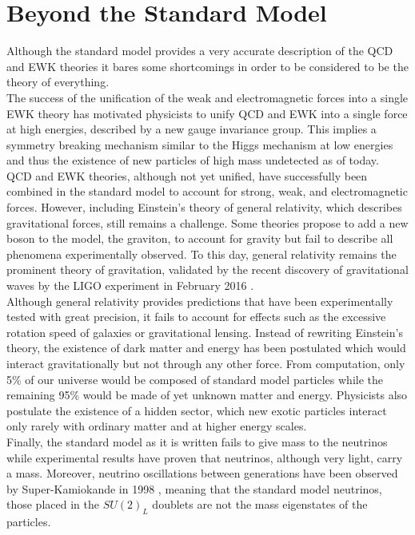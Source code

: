   \section{Beyond the Standard Model}

    Although the standard model provides a very accurate description of the QCD and EWK theories it bares some shortcomings in order to be considered to be the theory of everything. \\

    The success of the unification of the weak and electromagnetic forces into a single EWK theory has motivated physicists to unify QCD and EWK into a single force at high energies, described by a new gauge invariance group. This implies a symmetry breaking mechanism similar to the Higgs mechanism at low energies and thus the existence of new particles of high mass undetected as of today. \\

    QCD and EWK theories, although not yet unified, have successfully been combined in the standard model to account for strong, weak, and electromagnetic forces. However, including Einstein's theory of general relativity, which describes gravitational forces, still remains a challenge. Some theories propose to add a new boson to the model, the graviton, to account for gravity but fail to describe all phenomena experimentally observed. To this day, general relativity remains the prominent theory of gravitation, validated by the recent discovery of gravitational waves by the LIGO experiment in February 2016 \cite{PhysRevLett.116.061102}. \\

    Although general relativity provides predictions that have been experimentally tested with great precision, it fails to account for effects such as the excessive rotation speed of galaxies or gravitational lensing. Instead of rewriting Einstein's theory, the existence of dark matter and energy has been postulated which would interact gravitationally but not through any other force. From computation, only 5\% of our universe would be composed of standard model particles while the remaining 95\% would be made of yet unknown matter and energy. Physicists also postulate the existence of a hidden sector, which new exotic particles interact only rarely with ordinary matter and at higher energy scales. \\

    Finally, the standard model as it is written fails to give mass to the neutrinos while experimental results have proven that neutrinos, although very light, carry a mass. Moreover, neutrino oscillations between generations have been observed by Super-Kamiokande in 1998 \cite{Fukuda:1998mi}, meaning that the standard model neutrinos, those placed in the $ SU(2)_L $ doublets are not the mass eigenstates of the particles. \\

